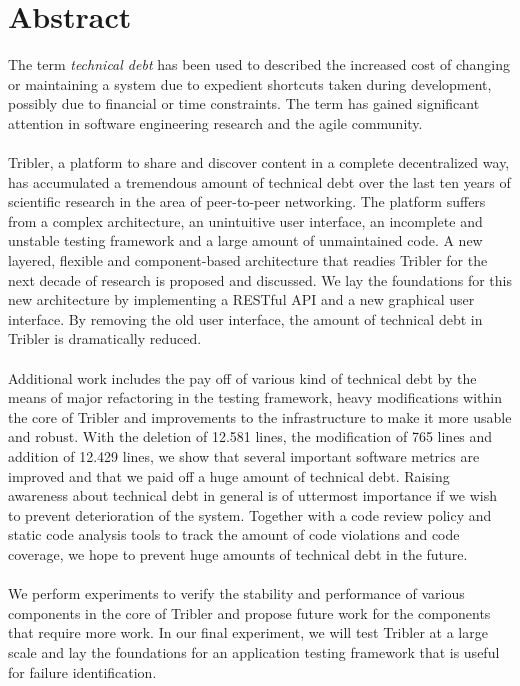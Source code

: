 \chapter*{Abstract}
The term \emph{technical debt} has been used to described the increased cost of changing or maintaining a system due to expedient shortcuts taken during development, possibly due to financial or time constraints. The term has gained significant attention in software engineering research and the agile community.\\\\
Tribler, a platform to share and discover content in a complete decentralized way, has accumulated a tremendous amount of technical debt over the last ten years of scientific research in the area of peer-to-peer networking.
The platform suffers from a complex architecture, an unintuitive user interface, an incomplete and unstable testing framework and a large amount of unmaintained code.
A new layered, flexible and component-based architecture that readies Tribler for the next decade of research is proposed and discussed.
We lay the foundations for this new architecture by implementing a RESTful API and a new graphical user interface. By removing the old user interface, the amount of technical debt in Tribler is dramatically reduced.\\\\
Additional work includes the pay off of various kind of technical debt by the means of major refactoring in the testing framework, heavy modifications within the core of Tribler and improvements to the infrastructure to make it more usable and robust.
With the deletion of 12.581 lines, the modification of 765 lines and addition of 12.429 lines, we show that several important software metrics are improved and that we paid off a huge amount of technical debt. 
Raising awareness about technical debt in general is of uttermost importance if we wish to prevent deterioration of the system.
Together with a code review policy and static code analysis tools to track the amount of code violations and code coverage, we hope to prevent huge amounts of technical debt in the future.\\\\
We perform experiments to verify the stability and performance of various components in the core of Tribler and propose future work for the components that require more work. In our final experiment, we will test Tribler at a large scale and lay the foundations for an application testing framework that is useful for failure identification.